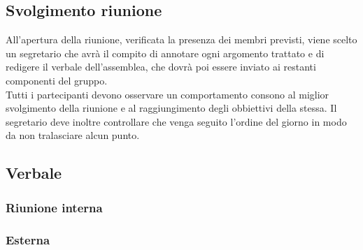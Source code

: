     \subsection{Svolgimento riunione}
      All’apertura della riunione, verificata la presenza dei membri previsti, viene scelto un segretario che avrà il compito di annotare ogni argomento trattato e di redigere il verbale
      dell’assemblea, che dovrà poi essere inviato ai restanti componenti del gruppo.\\
      Tutti i partecipanti devono osservare un comportamento consono al miglior svolgimento della riunione e al raggiungimento degli obbiettivi della stessa. Il segretario deve inoltre
      controllare che venga seguito l’ordine del giorno in modo da non tralasciare alcun punto.
    \subsection{Verbale}
      \subsubsection{Riunione interna}
      \subsubsection{Esterna}
